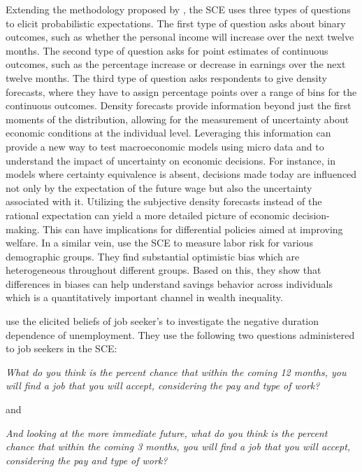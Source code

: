 \documentclass[11pt,a4paper,leqno]{article}
\begin{document}
Extending the methodology proposed by \textcite{Manski}, the SCE uses three types of questions to elicit probabilistic expectations. The first type of question asks about binary outcomes, such as whether the personal income will increase over the next twelve months. The second type of question asks for point estimates of continuous outcomes, such as the percentage increase or decrease in earnings over the next twelve months. The third type of question asks respondents to give density forecasts, where they have to assign percentage points over a range of bins for the continuous outcomes. Density forecasts provide information beyond just the first moments of the distribution, allowing for the measurement of uncertainty about economic conditions at the individual level. Leveraging this information can provide a new way to test macroeconomic models using micro data and to understand the impact of uncertainty on economic decisions. 
For instance, in models where certainty equivalence is absent, decisions made today are influenced not only by the expectation of the future wage but also the uncertainty associated with it. Utilizing the subjective density forecasts instead of the rational expectation can yield a more detailed picture of economic decision-making. This can have implications for differential policies aimed at improving welfare. 
In a similar vein, \textcite{Baleer2021} use the SCE to measure labor risk for various demographic groups. They find substantial optimistic bias which are heterogeneous throughout different groups. Based on this, they show that differences in biases can help understand savings behavior across individuals which is a quantitatively important channel in wealth inequality. 

%

\textcite{MST2021} use the elicited beliefs of job seeker's to investigate the negative duration dependence of unemployment. They use the following two questions administered to job seekers in the SCE:
\begin{center}
	\textit{What do you think is the percent chance that within the coming 12 months, you will find a job that you will accept, considering the pay and type of work?}
\end{center}
and
\begin{center}
	\textit{And looking at the more immediate future, what do you think is the percent chance that within the coming 3 months, you will find a job that you will accept, considering the pay and type of work?}
\end{center}
\end{document}
